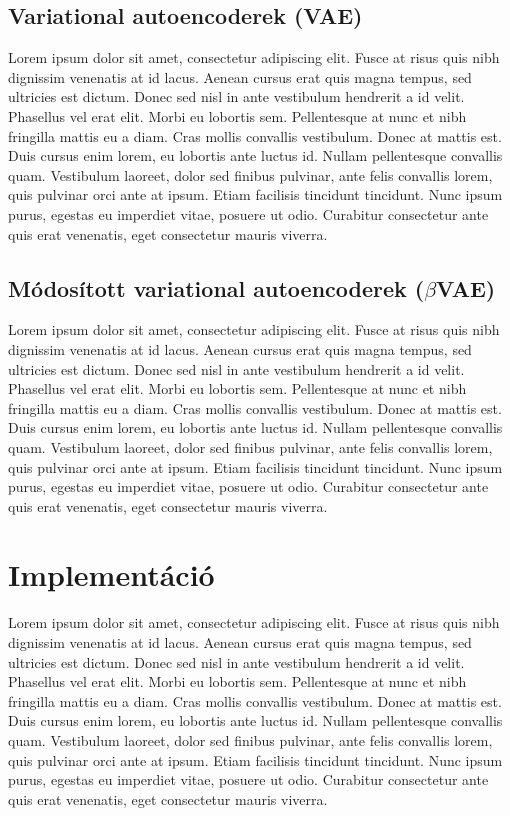 \documentclass[12pt]{article}
\begin{document}
\subsection{Variational autoencoderek (VAE)}

Lorem ipsum dolor sit amet, consectetur adipiscing elit. Fusce at risus quis nibh dignissim venenatis at id lacus. Aenean cursus erat quis magna tempus, sed ultricies est dictum. Donec sed nisl in ante vestibulum hendrerit a id velit. Phasellus vel erat elit. Morbi eu lobortis sem. Pellentesque at nunc et nibh fringilla mattis eu a diam. Cras mollis convallis vestibulum. Donec at mattis est. Duis cursus enim lorem, eu lobortis ante luctus id. Nullam pellentesque convallis quam. Vestibulum laoreet, dolor sed finibus pulvinar, ante felis convallis lorem, quis pulvinar orci ante at ipsum. Etiam facilisis tincidunt tincidunt. Nunc ipsum purus, egestas eu imperdiet vitae, posuere ut odio. Curabitur consectetur ante quis erat venenatis, eget consectetur mauris viverra.

\subsection{Módosított variational autoencoderek ($\beta$VAE)}

Lorem ipsum dolor sit amet, consectetur adipiscing elit. Fusce at risus quis nibh dignissim venenatis at id lacus. Aenean cursus erat quis magna tempus, sed ultricies est dictum. Donec sed nisl in ante vestibulum hendrerit a id velit. Phasellus vel erat elit. Morbi eu lobortis sem. Pellentesque at nunc et nibh fringilla mattis eu a diam. Cras mollis convallis vestibulum. Donec at mattis est. Duis cursus enim lorem, eu lobortis ante luctus id. Nullam pellentesque convallis quam. Vestibulum laoreet, dolor sed finibus pulvinar, ante felis convallis lorem, quis pulvinar orci ante at ipsum. Etiam facilisis tincidunt tincidunt. Nunc ipsum purus, egestas eu imperdiet vitae, posuere ut odio. Curabitur consectetur ante quis erat venenatis, eget consectetur mauris viverra.

\section{Implementáció}

Lorem ipsum dolor sit amet, consectetur adipiscing elit. Fusce at risus quis nibh dignissim venenatis at id lacus. Aenean cursus erat quis magna tempus, sed ultricies est dictum. Donec sed nisl in ante vestibulum hendrerit a id velit. Phasellus vel erat elit. Morbi eu lobortis sem. Pellentesque at nunc et nibh fringilla mattis eu a diam. Cras mollis convallis vestibulum. Donec at mattis est. Duis cursus enim lorem, eu lobortis ante luctus id. Nullam pellentesque convallis quam. Vestibulum laoreet, dolor sed finibus pulvinar, ante felis convallis lorem, quis pulvinar orci ante at ipsum. Etiam facilisis tincidunt tincidunt. Nunc ipsum purus, egestas eu imperdiet vitae, posuere ut odio. Curabitur consectetur ante quis erat venenatis, eget consectetur mauris viverra.
\end{document}
